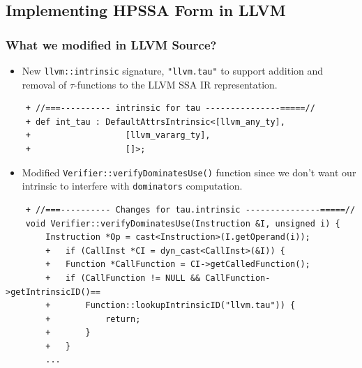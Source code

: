 \documentclass[aspectratio=169, compress]{beamer}
\begin{document}
\subsection{Implementing HPSSA Form in LLVM}

\begin{frame}[fragile]
	\frametitle{What we modified in LLVM Source?}
	\begin{itemize}
		\item New \texttt{llvm::intrinsic} signature, \texttt{"llvm.tau"} to support addition and removal of $\tau$-functions to the LLVM SSA IR representation. 
	\end{itemize}
	\begin{verbatim}
	+ //===---------- intrinsic for tau ---------------=====//
	+ def int_tau : DefaultAttrsIntrinsic<[llvm_any_ty],
	+                   [llvm_vararg_ty],
	+                   []>;
	\end{verbatim}
	\pause
	\begin{itemize}
		\item Modified \texttt{Verifier::verifyDominatesUse()} function since we don't want our intrinsic to interfere with \texttt{dominators} computation.  
	\end{itemize}
	\begin{verbatim}
	+ //===---------- Changes for tau.intrinsic ---------------=====//
	void Verifier::verifyDominatesUse(Instruction &I, unsigned i) {
		Instruction *Op = cast<Instruction>(I.getOperand(i));
		+	if (CallInst *CI = dyn_cast<CallInst>(&I)) {
		+	Function *CallFunction = CI->getCalledFunction();
		+	if (CallFunction != NULL && CallFunction->getIntrinsicID()==
		+		Function::lookupIntrinsicID("llvm.tau")) {
		+			return;
		+		}
		+	}
		...
	\end{verbatim}
\end{frame}
\end{document}
